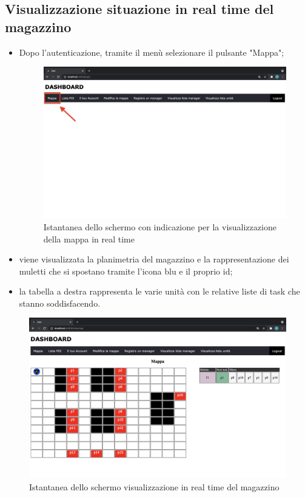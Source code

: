 \subsection{Visualizzazione situazione in real time del magazzino}
\begin{itemize}
    \item Dopo l'autenticazione, tramite il menù selezionare il pulsante "Mappa";
    \begin{figure}[H]
        \centering
        \includegraphics[scale=0.12]{res/images/dashboard1.png}
        \caption{Istantanea dello schermo con indicazione per la visualizzazione della mappa in real time}
    \end{figure}
    \item viene visualizzata la planimetria del magazzino e la rappresentazione dei muletti che si spostano tramite l'icona blu e il proprio id;
    \item la tabella a destra rappresenta le varie unità con le relative liste di task che stanno soddisfacendo.
    
\end{itemize}

\begin{figure}[H]
    \centering
    \includegraphics[scale=0.12]{res/images/map_user.png}
    \caption{Istantanea dello schermo visualizzazione in real time del magazzino}
\end{figure}

